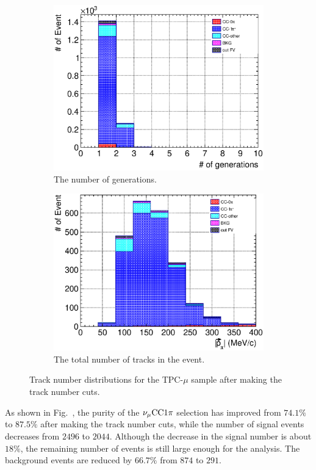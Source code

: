 \begin{figure}
\begin{subfigure}{\dbfigwid\textwidth}
       \includegraphics[width=\textwidth]{figures/sel/TPCmu_ngen_stack_al9.eps}
       \caption{The number of generations.}
       \label{subfig:tlpi-trknum-gen-cut}
  \end{subfigure}
  \begin{subfigure}{\dbfigwid\textwidth}
       \includegraphics[width=\textwidth]{figures/sel/TPCmu_p_pi_stack_al9.eps}
       \caption{The total number of tracks in the event.}
       \label{subfig:tlpi-trknum-ppi-cut}
  \end{subfigure}
  \caption{Track number distributions for the TPC-$\mu$ sample after making the track number cuts.}
  \label{fig:tlpi-trknum-tpcmu-cut}
\end{figure}
As shown in Fig.~\label{subfig:tlpi-trknum-ppi-cut}, the purity of the $\nu_{\mu}\textrm{CC}1\pi$ selection has improved from $74.1\%$ to $87.5\%$ after making the track number cuts, while the number of signal events decreases from $2496$ to $2044$.
Although the decrease in the signal number is about $18\%$, the remaining number of events is still large enough for the analysis.
The background events are reduced by $66.7\%$ from $874$ to $291$.

